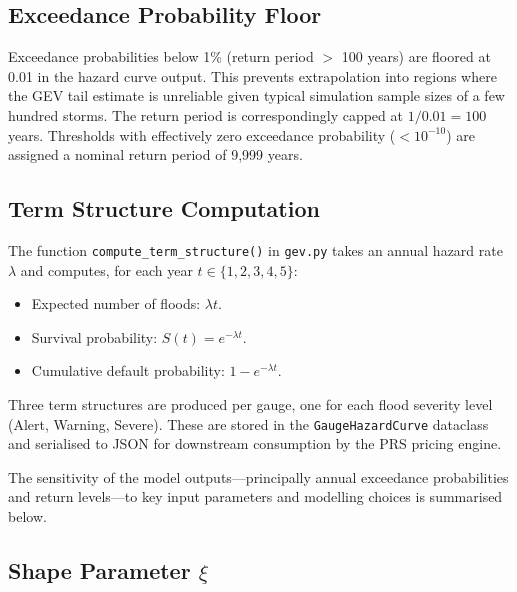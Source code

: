 \documentclass[11pt,a4paper]{article}
\begin{document}
\subsection{Exceedance Probability Floor}

Exceedance probabilities below 1\% (return period $>$ 100 years) are floored at 0.01 in the hazard curve output. This prevents extrapolation into regions where the GEV tail estimate is unreliable given typical simulation sample sizes of a few hundred storms. The return period is correspondingly capped at $1 / 0.01 = 100$ years. Thresholds with effectively zero exceedance probability ($< 10^{-10}$) are assigned a nominal return period of 9{,}999 years.

\subsection{Term Structure Computation}

The function \texttt{compute\_term\_structure()} in \texttt{gev.py} takes an annual hazard rate $\lambda$ and computes, for each year $t \in \{1, 2, 3, 4, 5\}$:

\begin{itemize}
    \item Expected number of floods: $\lambda t$.
    \item Survival probability: $S(t) = e^{-\lambda t}$.
    \item Cumulative default probability: $1 - e^{-\lambda t}$.
\end{itemize}

\noindent Three term structures are produced per gauge, one for each flood severity level (Alert, Warning, Severe). These are stored in the \texttt{GaugeHazardCurve} dataclass and serialised to JSON for downstream consumption by the PRS pricing engine.

\clearpage

\mkmsensitivity

The sensitivity of the model outputs---principally annual exceedance probabilities and return levels---to key input parameters and modelling choices is summarised below.

\subsection{Shape Parameter $\xi$}
\end{document}

